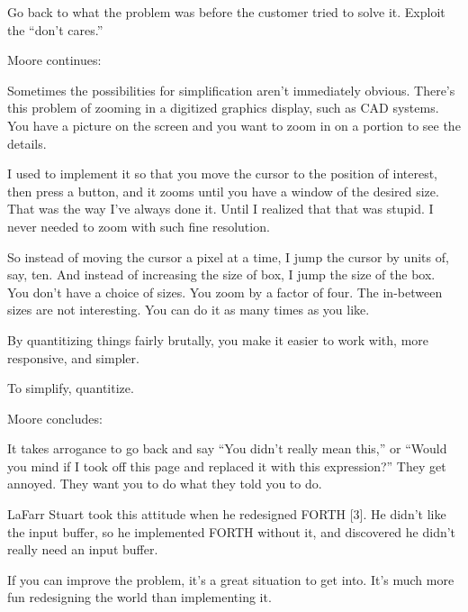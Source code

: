 \begin{tip}
Go back to what the problem was before the customer tried to solve it.
Exploit the ``don't cares.''
\end{tip}




\bigskip\blackline{2ex}
\noindent Moore continues:

\begin{tfquot}
Sometimes the possibilities for simplification aren't immediately obvious.
There's this problem of zooming in a digitized graphics display, such
as CAD systems. You have a picture on the screen and you want to zoom
in on a portion to see the details.

I used to implement it so that you move the cursor to the position of
interest, then press a button, and it zooms until you have a window of
the desired size. That was the way I've always done it. Until I
realized that that was stupid. I never needed to zoom with such fine
resolution.

So instead of moving the cursor a pixel at a time, I jump the cursor
by units of, say, ten. And instead of increasing the size of box, I
jump the size of the box. You don't have a choice of sizes. You zoom
by a factor of four. The in-between sizes are not interesting. You can
do it as many times as you like.

By quantitizing things fairly brutally, you make it easier to work with,
more responsive, and simpler.
\end{tfquot}
\blackline{2ex}

\begin{tip}
To simplify, quantitize.
\end{tip}

\bigskip\blackline{2ex}
\noindent Moore concludes:
\begin{tfquot}
It takes arrogance to go back and say ``You didn't really mean this,''
or ``Would you mind if I took off this page and replaced it with this
expression?'' They get annoyed. They want you to do what they told you
to do.

LaFarr Stuart took this attitude when he redesigned FORTH {[}3{]}. He
didn't like the input buffer, so he implemented FORTH without it, and
discovered he didn't really need an input buffer.

If you can improve the problem, it's a great situation to get into.
It's much more fun redesigning the world than implementing it.
\end{tfquot}
\blackline{2ex}

